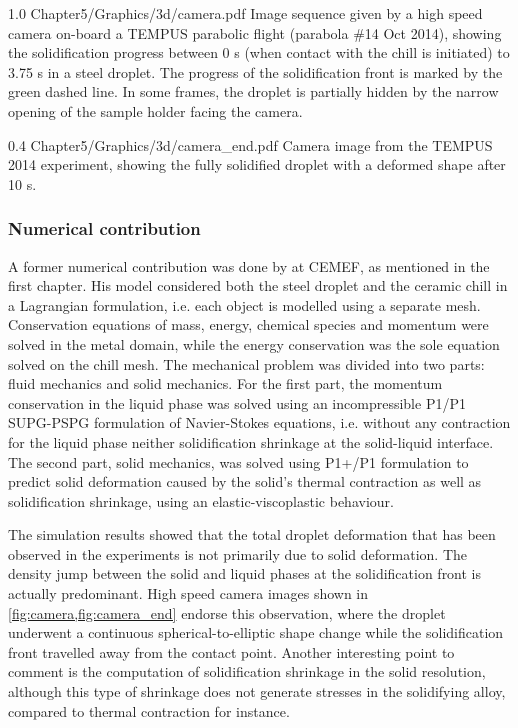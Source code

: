 \begin{figureth}
{1.0}
{Chapter5/Graphics/3d/camera.pdf}
{Image sequence given by a high speed camera on-board a TEMPUS parabolic flight (parabola \#14 Oct 2014), showing the 
solidification progress between 0 s (when contact with the chill is initiated) to 3.75 s in a  steel droplet. 
The progress of the solidification front is marked by the green dashed line. In some frames, the droplet is partially hidden by the narrow 
opening of the sample holder facing the camera.}
\label{fig:camera}
\end{figureth}

\begin{figureth}
{0.4}
{Chapter5/Graphics/3d/camera_end.pdf}
{Camera image from the TEMPUS 2014 experiment, showing the fully solidified droplet with a deformed shape after 10 s.}
\label{fig:camera_end}
\end{figureth}

\subsubsection{Numerical contribution}

A former numerical contribution was done by \citet{rivaux_simulation_2011} at CEMEF, as mentioned in the first chapter. 
His model considered both the steel droplet and the ceramic chill in a Lagrangian formulation, i.e. each object is
modelled using a separate mesh. Conservation equations of mass, energy,
chemical species and momentum were solved in the metal domain, while the energy
conservation was the sole equation solved on the chill mesh. The mechanical problem was divided
into two parts: fluid mechanics and solid mechanics. 
For the first part, the momentum conservation in the liquid phase was solved using an
incompressible P1/P1 SUPG-PSPG formulation of Navier-Stokes equations, i.e. 
without any contraction for the liquid phase neither solidification shrinkage at the solid-liquid interface.
The second part, solid mechanics, was solved using P1+/P1 formulation to predict solid deformation caused by the 
solid's thermal contraction as well as solidification shrinkage, 
using an elastic-viscoplastic behaviour. 

The simulation results showed that the total droplet deformation that has been
observed in the experiments is not primarily due to solid deformation. The density jump
between the solid and liquid phases at the solidification front is actually predominant. High
speed camera images shown in \cref{fig:camera,fig:camera_end} endorse this observation, where the droplet underwent a continuous
spherical-to-elliptic shape change while the solidification front travelled away from the
contact point. Another interesting point to comment is the computation of solidification
shrinkage in the solid resolution, although this type of shrinkage does not generate stresses 
in the solidifying alloy, compared to thermal contraction for instance.

